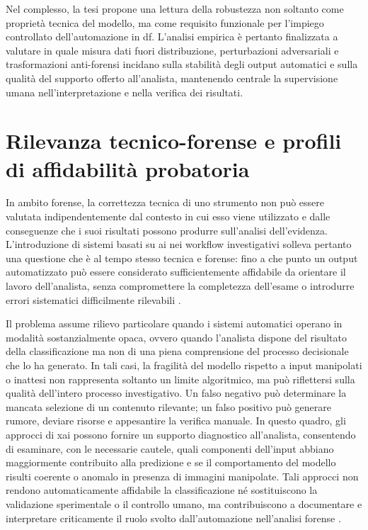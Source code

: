 Nel complesso, la tesi propone una lettura della robustezza non soltanto come proprietà tecnica del modello, ma come requisito funzionale per l'impiego controllato dell'automazione in \gls{df}. L'analisi empirica è pertanto finalizzata a valutare in quale misura dati fuori distribuzione, perturbazioni adversariali e trasformazioni anti-forensi incidano sulla stabilità degli output automatici e sulla qualità del supporto offerto all'analista, mantenendo centrale la supervisione umana nell'interpretazione e nella verifica dei risultati.


\section{Rilevanza tecnico-forense e profili di affidabilità probatoria}
In ambito forense, la correttezza tecnica di uno strumento non può essere valutata indipendentemente dal contesto in cui esso viene utilizzato e dalle conseguenze che i suoi risultati possono produrre sull'analisi dell'evidenza. L'introduzione di sistemi basati su \gls{ai} nei workflow investigativi solleva pertanto una questione che è al tempo stesso tecnica e forense: fino a che punto un output automatizzato può essere considerato sufficientemente affidabile da orientare il lavoro dell'analista, senza compromettere la completezza dell'esame o introdurre errori sistematici difficilmente rilevabili \cite{faqir2023digital,sanna2025cybercrime}.

Il problema assume rilievo particolare quando i sistemi automatici operano in modalità sostanzialmente opaca, ovvero quando l'analista dispone del risultato della classificazione ma non di una piena comprensione del processo decisionale che lo ha generato. In tali casi, la fragilità del modello rispetto a input manipolati o inattesi non rappresenta soltanto un limite algoritmico, ma può riflettersi sulla qualità dell'intero processo investigativo. Un falso negativo può determinare la mancata selezione di un contenuto rilevante; un falso positivo può generare rumore, deviare risorse e appesantire la verifica manuale. In questo quadro, gli approcci di \gls{xai} possono fornire un supporto diagnostico all'analista, consentendo di esaminare, con le necessarie cautele, quali componenti dell'input abbiano maggiormente contribuito alla predizione e se il comportamento del modello risulti coerente o anomalo in presenza di immagini manipolate. Tali approcci non rendono automaticamente affidabile la classificazione né sostituiscono la validazione sperimentale o il controllo umano, ma contribuiscono a documentare e interpretare criticamente il ruolo svolto dall'automazione nell'analisi forense \cite{Adadi2018,Doshi-Velez2017}.

